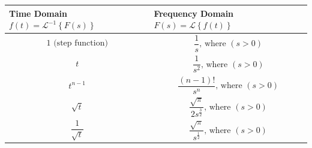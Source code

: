 \documentclass[
]{book}
\begin{document}
\begin{longtable}[]{@{}ll@{}}
\toprule
\begin{minipage}[b]{0.42\columnwidth}\raggedright
Time Domain \(f(t) = \mathcal{L}^{-1} \left\{ F \left( s \right) \right\}\)\strut
\end{minipage} & \begin{minipage}[b]{0.52\columnwidth}\raggedright
Frequency Domain \(F\left( s \right) = \mathcal{L} \left\{ f \left( t \right) \right\}\)\strut
\end{minipage}\tabularnewline
\midrule
\endhead
\begin{minipage}[t]{0.42\columnwidth}\raggedright
\[1 \text{ (step function)}\]\strut
\end{minipage} & \begin{minipage}[t]{0.52\columnwidth}\raggedright
\[\frac{1}{s} \text{, where } \left(s\gt 0\right) \]\strut
\end{minipage}\tabularnewline
\begin{minipage}[t]{0.42\columnwidth}\raggedright
\[t\]\strut
\end{minipage} & \begin{minipage}[t]{0.52\columnwidth}\raggedright
\[\frac{1}{s^2} \text{, where } \left(s\gt 0\right) \]\strut
\end{minipage}\tabularnewline
\begin{minipage}[t]{0.42\columnwidth}\raggedright
\[t^{n-1}\]\strut
\end{minipage} & \begin{minipage}[t]{0.52\columnwidth}\raggedright
\[\frac{\left( n-1 \right)!}{s^n} \text{, where } \left(s\gt 0\right) \]\strut
\end{minipage}\tabularnewline
\begin{minipage}[t]{0.42\columnwidth}\raggedright
\[\sqrt{t}\]\strut
\end{minipage} & \begin{minipage}[t]{0.52\columnwidth}\raggedright
\[\frac{{\sqrt \pi  }}{{2{s^{\frac{3}{2}}}}} \text{, where } \left(s\gt 0\right) \]\strut
\end{minipage}\tabularnewline
\begin{minipage}[t]{0.42\columnwidth}\raggedright
\[\frac{1}{\sqrt{t}}\]\strut
\end{minipage} & \begin{minipage}[t]{0.52\columnwidth}\raggedright
\[\frac{{\sqrt \pi  }}{{{s^{\frac{1}{2}}}}} \text{, where } \left(s\gt 0\right) \]\strut
\end{minipage}\tabularnewline

\end{longtable}
\end{document}
